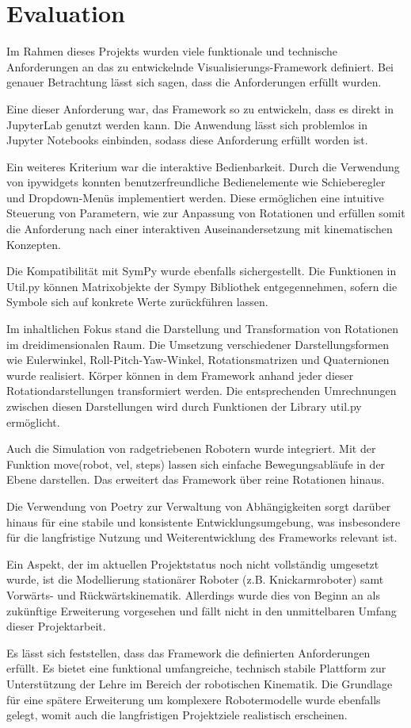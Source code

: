 \section{Evaluation}
Im Rahmen dieses Projekts wurden viele funktionale und technische Anforderungen an das zu entwickelnde Visualisierungs-Framework definiert.
Bei genauer Betrachtung lässt sich sagen, dass die Anforderungen erfüllt wurden.

Eine dieser Anforderung war, das Framework so zu entwickeln,
dass es direkt in JupyterLab genutzt werden kann.
Die Anwendung lässt sich problemlos in Jupyter Notebooks einbinden, sodass diese Anforderung erfüllt worden ist.

Ein weiteres Kriterium war die interaktive Bedienbarkeit.
Durch die Verwendung von ipywidgets konnten benutzerfreundliche Bedienelemente wie Schieberegler und Dropdown-Menüs implementiert werden.
Diese ermöglichen eine intuitive Steuerung von Parametern, wie zur Anpassung von Rotationen und erfüllen somit die
Anforderung nach einer interaktiven Auseinandersetzung mit kinematischen Konzepten.

Die Kompatibilität mit SymPy wurde ebenfalls sichergestellt. Die Funktionen in Util.py können Matrixobjekte der Sympy Bibliothek entgegennehmen,
sofern die Symbole sich auf konkrete Werte zurückführen lassen.

Im inhaltlichen Fokus stand die Darstellung und Transformation von Rotationen im dreidimensionalen Raum.
Die Umsetzung verschiedener Darstellungsformen wie Eulerwinkel, Roll-Pitch-Yaw-Winkel, Rotationsmatrizen und Quaternionen wurde realisiert.
Körper können in dem Framework anhand jeder dieser Rotationdarstellungen transformiert werden.
Die entsprechenden Umrechnungen zwischen diesen Darstellungen wird durch Funktionen der Library util.py ermöglicht.

Auch die Simulation von radgetriebenen Robotern wurde integriert. Mit der Funktion move(robot, vel, steps)
lassen sich einfache Bewegungsabläufe in der Ebene darstellen. Das erweitert das Framework über reine Rotationen hinaus.

Die Verwendung von Poetry zur Verwaltung von Abhängigkeiten sorgt darüber hinaus für eine stabile und konsistente Entwicklungsumgebung,
was insbesondere für die langfristige Nutzung und Weiterentwicklung des Frameworks relevant ist.

Ein Aspekt, der im aktuellen Projekt\-status noch nicht voll\-stän\-dig um\-ge\-setzt wurde,
ist die Modellierung stationärer Roboter (z.B. Knickarmroboter) samt Vorwärts- und Rückwärtskinematik.
Allerdings wurde dies von Beginn an als zukünftige Erweiterung vorgesehen und fällt nicht in den unmittelbaren Umfang dieser Projektarbeit.

Es lässt sich feststellen, dass das Framework die definierten Anforderungen erfüllt.
Es bietet eine funktional umfangreiche, technisch stabile Plattform zur Unterstützung der Lehre im Bereich der robotischen Kinematik.
Die Grundlage für eine spätere Erweiterung um komplexere Robotermodelle wurde ebenfalls gelegt, womit auch die langfristigen Projektziele realistisch erscheinen.